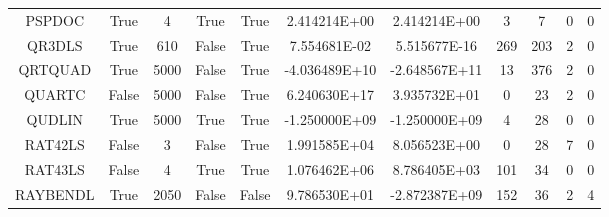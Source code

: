 \begin{longtable}{ccccccccccc}
	\cellcolor{default2} PSPDOC& \cellcolor{default2} True& \cellcolor{default2} 4& \cellcolor{default2} True& \cellcolor{default2} True& \cellcolor{best} 2.414214E+00& \cellcolor{ok} 2.414214E+00& \cellcolor{best} 3& \cellcolor{poor} 7& \cellcolor{default2} 0& \cellcolor{default2} 0\\
	\cellcolor{default1} QR3DLS& \cellcolor{default1} True& \cellcolor{default1} 610& \cellcolor{default1} False& \cellcolor{default1} True& \cellcolor{poor} 7.554681E-02& \cellcolor{best} 5.515677E-16& \cellcolor{ok} 269& \cellcolor{best} 203& \cellcolor{default1} 2& \cellcolor{default1} 0\\
	\cellcolor{default2} QRTQUAD& \cellcolor{default2} True& \cellcolor{default2} 5000& \cellcolor{default2} False& \cellcolor{default2} True& \cellcolor{poor} -4.036489E+10& \cellcolor{best} -2.648567E+11& \cellcolor{best} 13& \cellcolor{poor} 376& \cellcolor{default2} 2& \cellcolor{default2} 0\\
	\cellcolor{default1} QUARTC& \cellcolor{default1} False& \cellcolor{default1} 5000& \cellcolor{default1} False& \cellcolor{default1} True& \cellcolor{poor} 6.240630E+17& \cellcolor{best} 3.935732E+01& \cellcolor{best} 0& \cellcolor{poor} 23& \cellcolor{default1} 2& \cellcolor{default1} 0\\
	\cellcolor{default2} QUDLIN& \cellcolor{default2} True& \cellcolor{default2} 5000& \cellcolor{default2} True& \cellcolor{default2} True& \cellcolor{best} -1.250000E+09& \cellcolor{best} -1.250000E+09& \cellcolor{best} 4& \cellcolor{poor} 28& \cellcolor{default2} 0& \cellcolor{default2} 0\\
	\cellcolor{default1} RAT42LS& \cellcolor{default1} False& \cellcolor{default1} 3& \cellcolor{default1} False& \cellcolor{default1} True& \cellcolor{poor} 1.991585E+04& \cellcolor{best} 8.056523E+00& \cellcolor{best} 0& \cellcolor{poor} 28& \cellcolor{default1} 7& \cellcolor{default1} 0\\
	\cellcolor{default2} RAT43LS& \cellcolor{default2} False& \cellcolor{default2} 4& \cellcolor{default2} True& \cellcolor{default2} True& \cellcolor{poor} 1.076462E+06& \cellcolor{best} 8.786405E+03& \cellcolor{poor} 101& \cellcolor{best} 34& \cellcolor{default2} 0& \cellcolor{default2} 0\\
	\cellcolor{default1} RAYBENDL& \cellcolor{default1} True& \cellcolor{default1} 2050& \cellcolor{default1} False& \cellcolor{default1} False& \cellcolor{poor} 9.786530E+01& \cellcolor{best} -2.872387E+09& \cellcolor{poor} 152& \cellcolor{best} 36& \cellcolor{default1} 2& \cellcolor{default1} 4\\

\end{longtable}
